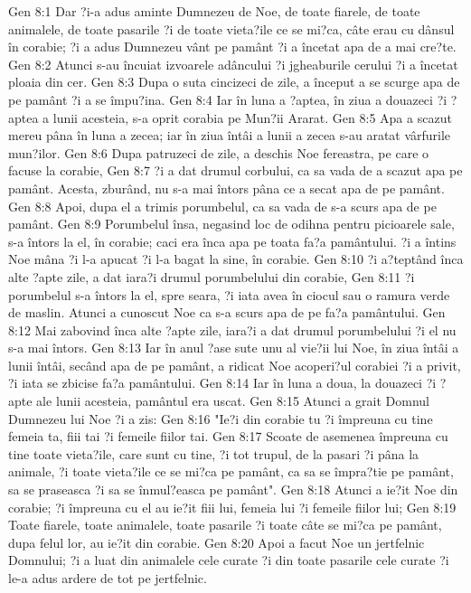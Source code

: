 Gen 8:1  Dar ?i-a adus aminte Dumnezeu de Noe, de toate fiarele, de toate animalele, de toate pasarile ?i de toate vieta?ile ce se mi?ca, câte erau cu dânsul în corabie; ?i a adus Dumnezeu vânt pe pamânt ?i a încetat apa de a mai cre?te.
Gen 8:2  Atunci s-au încuiat izvoarele adâncului ?i jgheaburile cerului ?i a încetat ploaia din cer.
Gen 8:3  Dupa o suta cincizeci de zile, a început a se scurge apa de pe pamânt ?i a se împu?ina.
Gen 8:4  Iar în luna a ?aptea, în ziua a douazeci ?i ?aptea a lunii acesteia, s-a oprit corabia pe Mun?ii Ararat.
Gen 8:5  Apa a scazut mereu pâna în luna a zecea; iar în ziua întâi a lunii a zecea s-au aratat vârfurile mun?ilor.
Gen 8:6  Dupa patruzeci de zile, a deschis Noe fereastra, pe care o facuse la corabie,
Gen 8:7  ?i a dat drumul corbului, ca sa vada de a scazut apa pe pamânt. Acesta, zburând, nu s-a mai întors pâna ce a secat apa de pe pamânt.
Gen 8:8  Apoi, dupa el a trimis porumbelul, ca sa vada de s-a scurs apa de pe pamânt.
Gen 8:9  Porumbelul însa, negasind loc de odihna pentru picioarele sale, s-a întors la el, în corabie; caci era înca apa pe toata fa?a pamântului. ?i a întins Noe mâna ?i l-a apucat ?i l-a bagat la sine, în corabie.
Gen 8:10  ?i a?teptând înca alte ?apte zile, a dat iara?i drumul porumbelului din corabie,
Gen 8:11  ?i porumbelul s-a întors la el, spre seara, ?i iata avea în ciocul sau o ramura verde de maslin. Atunci a cunoscut Noe ca s-a scurs apa de pe fa?a pamântului.
Gen 8:12  Mai zabovind înca alte ?apte zile, iara?i a dat drumul porumbelului ?i el nu s-a mai întors.
Gen 8:13  Iar în anul ?ase sute unu al vie?ii lui Noe, în ziua întâi a lunii întâi, secând apa de pe pamânt, a ridicat Noe acoperi?ul corabiei ?i a privit, ?i iata se zbicise fa?a pamântului.
Gen 8:14  Iar în luna a doua, la douazeci ?i ?apte ale lunii acesteia, pamântul era uscat.
Gen 8:15  Atunci a grait Domnul Dumnezeu lui Noe ?i a zis:
Gen 8:16  "Ie?i din corabie tu ?i împreuna cu tine femeia ta, fiii tai ?i femeile fiilor tai.
Gen 8:17  Scoate de asemenea împreuna cu tine toate vieta?ile, care sunt cu tine, ?i tot trupul, de la pasari ?i pâna la animale, ?i toate vieta?ile ce se mi?ca pe pamânt, ca sa se împra?tie pe pamânt, sa se praseasca ?i sa se înmul?easca pe pamânt".
Gen 8:18  Atunci a ie?it Noe din corabie; ?i împreuna cu el au ie?it fiii lui, femeia lui ?i femeile fiilor lui;
Gen 8:19  Toate fiarele, toate animalele, toate pasarile ?i toate câte se mi?ca pe pamânt, dupa felul lor, au ie?it din corabie.
Gen 8:20  Apoi a facut Noe un jertfelnic Domnului; ?i a luat din animalele cele curate ?i din toate pasarile cele curate ?i le-a adus ardere de tot pe jertfelnic.
